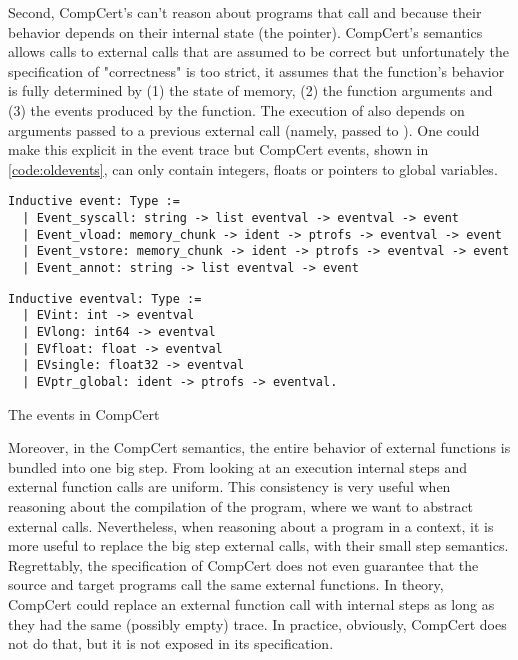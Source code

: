 Second, CompCert's can't reason about programs that call  and  because their behavior depends on their internal state (the  pointer). CompCert's semantics allows calls to external calls that are assumed to be correct but unfortunately the specification of "correctness" is too strict, it assumes that the function's behavior is fully determined by (1) the state of memory, (2) the function arguments and (3) the events produced by the function. The execution of  also depends on arguments passed to a previous external call (namely,  passed to ). One could make this explicit in the event trace but CompCert events, shown in \ref{code:oldevents}, can only contain integers, floats or pointers to global variables.
 
\begin{table}\centering
\begin{multicols}{2}
\begin{lstlisting}[style=CoqTheorem-list]
Inductive event: Type :=
  | Event_syscall: string -> list eventval -> eventval -> event
  | Event_vload: memory_chunk -> ident -> ptrofs -> eventval -> event
  | Event_vstore: memory_chunk -> ident -> ptrofs -> eventval -> event
  | Event_annot: string -> list eventval -> event
  \end{lstlisting}
  
  \begin{lstlisting}
Inductive eventval: Type :=
  | EVint: int -> eventval
  | EVlong: int64 -> eventval
  | EVfloat: float -> eventval
  | EVsingle: float32 -> eventval
  | EVptr_global: ident -> ptrofs -> eventval.
  \end{lstlisting}
\end{multicols}
\caption{The events in CompCert}\label{code:oldevents}
\end{table}

Moreover, in the CompCert semantics, the entire behavior of external functions is bundled into one big step. From looking at an execution internal steps and external function calls are uniform. This consistency is very useful when reasoning about the compilation of the program, where we want to abstract external calls. Nevertheless, when reasoning about a program in a context, it is more useful to replace the big step external calls, with their small step semantics. Regrettably, the specification of CompCert does not even guarantee that the source and target programs call the same external functions. In theory, CompCert could replace an external function call with internal steps as long as they had the same (possibly empty) trace. In practice, obviously, CompCert does not do that, but it is not exposed in its specification.

